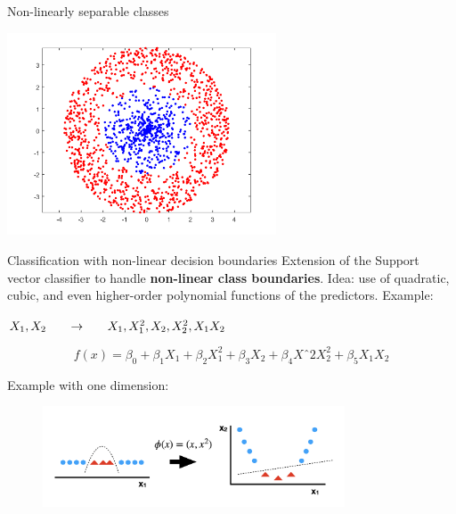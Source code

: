 \documentclass[notes]{beamer}          %
\begin{document}
\begin{frame}{Non-linearly separable classes}
\begin{center}
\includegraphics[height=6cm]{../figures/week_2_classification/nonseparableclass.png}  
\end{center}


\end{frame}

\begin{frame}{Classification with non-linear decision boundaries}
Extension of the Support vector classifier to handle \textbf{non-linear class boundaries}. 
Idea: use of quadratic, cubic, and even higher-order polynomial functions of the predictors.
Example:
\begin{center}{
$X_1, X_2 \hspace{0.05\textwidth}\to\hspace{0.05\textwidth} X_1, X^2_1, X_2, X^2_2, X_1X_2$}
\end{center}
\begin{equation*}
	f(x)=\beta_0 + \beta_1X_1 + \beta_2X^2_1 + \beta_3X_2 + 		\beta_4Xˆ2X^2_2+ \beta_5X_1X_2 
\end{equation*}

Example with one dimension:
\begin{figure}
  \includegraphics[width=0.8\textwidth]{../figures/week_2_classification/SVM_kernel}  
\end{figure}


\end{frame}
\end{document}

